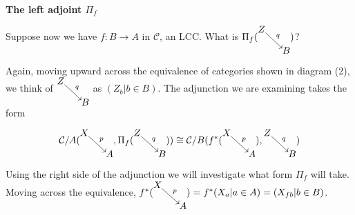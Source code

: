 \documentclass{article}
\theoremstyle{problemstyle}
\theoremstyle{problemstyle}
\theoremstyle{problemstyle}
\theoremstyle{problemstyle}
\theoremstyle{problemstyle}
\theoremstyle{problemstyle}
\theoremstyle{problemstyle}
\theoremstyle{problemstyle}
\begin{document}
{ \ }


\begin{flushleft}
\textbf{The left adjoint $\Pi_f$}
\end{flushleft}

Suppose now we have $f:B \rightarrow A$ in $\mathcal{C}$, an LCC. What is $\Pi_f(\begin{tikzcd}[cramped, sep=small] Z \arrow[rd, "q", start anchor={[xshift=-.6ex, yshift= .7ex]},end anchor={[xshift=.7ex, yshift= -.7ex]}]  &  \\  &  B \end{tikzcd})$? 

Again, moving upward across the equivalence of categories shown in diagram (2), we think of $\begin{tikzcd}[cramped, sep=small] Z \arrow[rd, "q", start anchor={[xshift=-.6ex, yshift= .7ex]},end anchor={[xshift=.7ex, yshift= -.7ex]}]  &  \\  &  B \end{tikzcd}$ as $(Z_b|b \in B)$. The adjunction we are examining takes the form 

$$
\mathcal{C}/A(
\begin{tikzcd}[cramped, sep=small] X \arrow[rd, "p", start anchor={[xshift=-.6ex, yshift= .7ex]},end anchor={[xshift=.7ex, yshift= -.7ex]}]  &  \\  &  A \end{tikzcd}
,\Pi_f(\begin{tikzcd}[cramped, sep=small] Z \arrow[rd, "q", start anchor={[xshift=-.6ex, yshift= .7ex]},end anchor={[xshift=.7ex, yshift= -.7ex]}]  &  \\  &  B \end{tikzcd}))
\cong
\mathcal{C}/B(f^*(
\begin{tikzcd}[cramped, sep=small] X \arrow[rd, "p", start anchor={[xshift=-.6ex, yshift= .7ex]},end anchor={[xshift=.7ex, yshift= -.7ex]}]  &  \\  &  A \end{tikzcd})
,\begin{tikzcd}[cramped, sep=small] Z \arrow[rd, "q", start anchor={[xshift=-.6ex, yshift= .7ex]},end anchor={[xshift=.7ex, yshift= -.7ex]}]  &  \\  &  B \end{tikzcd})
$$

Using the right side of the adjunction we will investigate what form $\Pi_f$ will take. Moving across the equivalence, $f^*(
\begin{tikzcd}[cramped, sep=small] X \arrow[rd, "p", start anchor={[xshift=-.6ex, yshift= .7ex]},end anchor={[xshift=.7ex, yshift= -.7ex]}]  &  \\  &  A \end{tikzcd}) = f^*(X_a|a\in A) = (X_{fb}|b \in B)$. 
\end{document}
